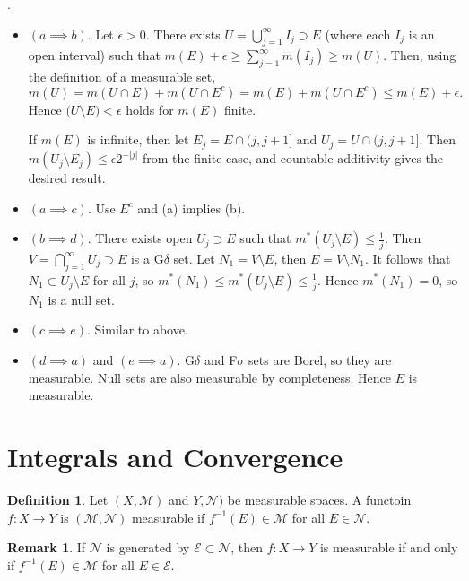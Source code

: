 \documentclass[11pt]{article}
\theoremstyle{definition}
\newtheorem{defn}{Definition}[section]
\newtheorem{remark}{Remark}[section]
\newcommand{\sm}[0]{\setminus}
\newcommand{\abs}[1]{\left\lvert#1\right\rvert} %
\newcommand{\m}[1]{\mathcal{#1}}
\begin{document}
\proof .
\begin{itemize}
\item[] $(a\implies b)$. Let $\epsilon>0$. There exists $U=\bigcup_{j=1}^\infty I_j \supset E$
(where each $I_j$ is an open interval) such that $m(E)+\epsilon\ge\sum_{j=1}^\infty m(I_j)
\ge m(U)$. Then, using the definition of a measurable set,
\[
  m(U) = m(U\cap E) + m(U\cap E^c) = m(E) + m(U\cap E^c) \le m(E)+\epsilon .
\]
Hence $\m(U\sm E)<\epsilon$ holds for $m(E)$ finite.

If $m(E)$ is infinite, then let $E_j=E\cap(j,j+1]$ and $U_j=U\cap(j,j+1]$. Then $m(U_j\sm
E_j) \le \epsilon2^{-\abs{j}}$ from the finite case, and countable additivity gives the
desired result.

\item[] $(a\implies c)$. Use $E^c$ and (a) implies (b).

\item[] $(b\implies d)$. There exists open $U_j\supset E$ such that $m^*(U_j\sm
E)\le\frac1j$. Then $V=\bigcap_{j=1}^\infty U_j \supset E$ is a G$\delta$ set. Let
$N_1=V\sm E$, then $E=V\sm N_1$. It follows that $N_1\subset U_j\sm E$ for all $j$, so
$m^*(N_1)\le m^*(U_j\sm E)\le \frac1j$. Hence $m^*(N_1)=0$, so $N_1$ is a null set.

\item[] $(c\implies e)$. Similar to above. 

\item[] $(d\implies a)$ and $(e\implies a)$. G$\delta$ and F$\sigma$ sets are Borel, so
they are measurable. Null sets are also measurable by completeness. Hence $E$ is
measurable. 
\end{itemize}
\qedhere




\section{Integrals and Convergence}

\begin{defn}
  Let $(X,\m{M})$ and $Y,\m{N})$ be measurable spaces. A functoin $f:X\to Y$ is
  $(\m{M},\m{N})$ measurable if $f^{-1}(E)\in\m{M}$ for all $E\in\m{N}$. 
\end{defn}

\begin{remark}
  If $\m{N}$ is generated by $\m{E}\subset\m{N}$, then $f:X\to Y$ is measurable if and only
  if $f^{-1}(E)\in\m{M}$ for all $E\in\m{E}$.
\end{remark}
\end{document}
